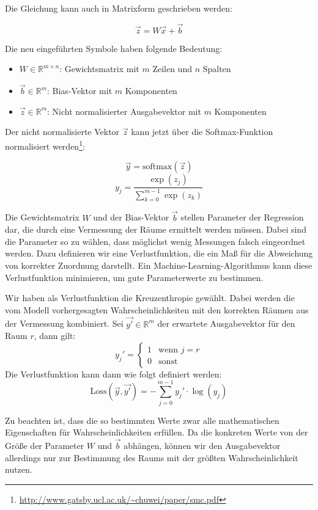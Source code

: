 Die Gleichung kann auch in Matrixform geschrieben werden:

$$ \vec{z} = W \vec{x} + \vec{b} $$

Die neu eingeführten Symbole haben folgende Bedeutung:
\begin{itemize}
	\item $W \in \mathbb{R}^{m \times n}$: Gewichtsmatrix mit $m$ Zeilen und $n$ Spalten
	\item $\vec{b} \in \mathbb{R}^m$: Bias-Vektor mit $m$ Komponenten
	\item $\vec{z} \in \mathbb{R}^m$: Nicht normalisierter Ausgabevektor mit $m$ Komponenten
\end{itemize}

Der nicht normalisierte Vektor $\vec{z}$ kann jetzt über die Softmax-Funktion normalisiert
werden\footnote{\url{http://www.gatsby.ucl.ac.uk/~chuwei/paper/smc.pdf}}:

$$ \vec{y} = \text{softmax}(\vec{z}) $$
$$ y_j = \frac{\exp(z_j)}{\sum_{k=0}^{m-1} \exp(z_k) } $$

Die Gewichtsmatrix $W$ und der Bias-Vektor $\vec{b}$ stellen Parameter der Regression dar,
die durch eine Vermessung der Räume ermittelt werden müssen. Dabei sind die Parameter so
zu wählen, dass möglichst wenig Messungen falsch eingeordnet werden. Dazu definieren wir
eine Verlustfunktion, die ein Maß für die Abweichung von korrekter Zuordnung darstellt.
Ein Machine-Learning-Algorithmus kann diese Verlustfunktion minimieren, um
gute Parameterwerte zu bestimmen.

Wir haben als Verlustfunktion die Kreuzenthropie gewählt. Dabei werden die vom Modell vorhergesagten
Wahrscheinlichkeiten mit den korrekten Räumen aus der Vermessung kombiniert.
Sei $\vec{y'} \in \mathbb{R}^m$ der erwartete Ausgabevektor für den Raum $r$, dann gilt:
\[
y_j' = 
\begin{cases}
	1 & \text{wenn } j = r  \\ 
	0 & \text{sonst}
\end{cases}
\]
Die Verlustfunktion kann dann wie folgt definiert werden:
$$ \text{Loss}(\vec{y}, \vec{y'}) = - \sum_{j=0}^{m-1} y_j' \cdot \log(y_j) $$

Zu beachten ist, dass die so bestimmten Werte zwar alle mathematischen
Eigenschaften für Wahrscheinlichkeiten erfüllen. Da die konkreten Werte von der
Größe der Parameter $W$ und $\vec{b}$ abhängen, können wir den Ausgabevektor
allerdings nur zur Bestimmung des Raums mit der größten Wahrscheinlichkeit nutzen.

